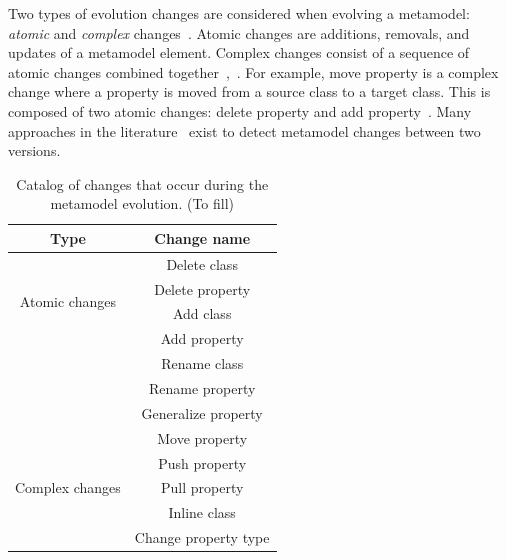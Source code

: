  
 Two types of evolution changes are considered when evolving a metamodel: \emph{atomic} and \emph{complex} changes~\cite{hebig2016approaches,Herrmannsdoerfer2011}. 
 Atomic changes are additions, removals, and updates of a metamodel element. Complex changes consist of a sequence of atomic changes combined together~\cite{vermolen_reconstructing_2012},~\cite{khelladi2015detecting}. For example, move property is a complex change where a property is moved from a source class to a target class. This is composed of two atomic changes: delete property and add property~\cite{Herrmannsdoerfer2011}. 
 Many approaches in the literature~\cite{Alter2015, williams2012searching,cicchetti_managing_2009,langer_posteriori_2013,vermolen_reconstructing_2012,Khelladi2016,bettini2022executable} exist to detect metamodel changes between two versions.
  \begin{table}[t]
  		\caption{Catalog of changes that occur during the metamodel evolution. (To fill)}
  	\label{table:changesCatalog}
 \vspace{1em}
 	\begin{tabular}{ |c|c| } 
 	
 		\hline
 		Type  & Change name \\
 		\hline
 		\multirow{4}{4em}{ Atomic changes} & Delete class  \\ 
 		& Delete property \\ 
 		& Add class \\ 
 		& Add property \\ 
 		& Rename class \\ 
 		& Rename property \\ 
 		& Generalize property \\ 
 		\hline
 		\hline
 		\multirow{5}{4em}{Complex changes} & Move property \\ 
 		& Push property  \\ 
 		& Pull property\\ 
 		& Inline class\\
 		& Change property type\\
 		\hline
 		
 	\end{tabular}
 	\end{table}
 	\vspace{1em}
 	
